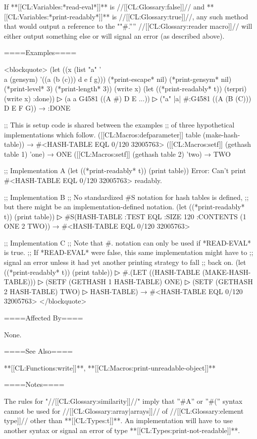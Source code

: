 If **[[CL:Variables:*read-eval*]]** is //[[CL:Glossary:false]]// and **[[CL:Variables:*print-readably*]]** is //[[CL:Glossary:true]]//, any such method that would output a reference to the ""#.'''' //[[CL:Glossary:reader macro]]// will either output something else or will signal an error (as described above).

====Examples====

<blockquote> (let ((x (list "a" '\\a (gensym) '((a (b (c))) d e f g))) (*print-escape* nil) (*print-gensym* nil) (*print-level* 3) (*print-length* 3)) (write x) (let ((*print-readably* t)) (terpri) (write x) :done))
▷ (a a G4581 ((A #) D E ...))
▷ ("a" |a| #:G4581 ((A (B (C))) D E F G)) → :DONE

;; This is setup code is shared between the examples ;; of three hypothetical implementations which follow. ([[CL:Macros:defparameter]] table (make-hash-table)) → #<HASH-TABLE EQL 0/120 32005763> ([[CL:Macros:setf]] (gethash table 1) 'one) → ONE ([[CL:Macros:setf]] (gethash table 2) 'two) → TWO

;; Implementation A (let ((*print-readably* t)) (print table)) Error: Can't print #<HASH-TABLE EQL 0/120 32005763> readably.

;; Implementation B ;; No standardized #S notation for hash tables is defined, ;; but there might be an implementation-defined notation. (let ((*print-readably* t)) (print table))
▷ #S(HASH-TABLE :TEST EQL :SIZE 120 :CONTENTS (1 ONE 2 TWO)) → #<HASH-TABLE EQL 0/120 32005763>

;; Implementation C ;; Note that #. notation can only be used if *READ-EVAL* is true. ;; If *READ-EVAL* were false, this same implementation might have to ;; signal an error unless it had yet another printing strategy to fall ;; back on. (let ((*print-readably* t)) (print table))
▷ #.(LET ((HASH-TABLE (MAKE-HASH-TABLE)))
▷ (SETF (GETHASH 1 HASH-TABLE) ONE)
▷ (SETF (GETHASH 2 HASH-TABLE) TWO)
▷ HASH-TABLE) → #<HASH-TABLE EQL 0/120 32005763> </blockquote>

====Affected By====

None.

====See Also====

**[[CL:Functions:write]]**, **[[CL:Macros:print-unreadable-object]]**

====Notes====

The rules for "//[[CL:Glossary:similarity]]//" imply that ''#A'' or ''#('' syntax cannot be used for //[[CL:Glossary:array|arrays]]// of //[[CL:Glossary:element type]]// other than **[[CL:Types:t]]**. An implementation will have to use another syntax or signal an error of type **[[CL:Types:print-not-readable]]**.

  
